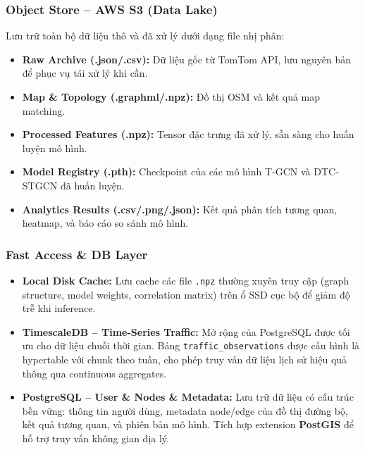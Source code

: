 \subsubsection{Object Store -- AWS S3 (Data Lake)}
Lưu trữ toàn bộ dữ liệu thô và đã xử lý dưới dạng file nhị phân:
\begin{itemize}
    \item \textbf{Raw Archive (.json/.csv):} Dữ liệu gốc từ TomTom API, lưu nguyên bản để phục vụ tái xử lý khi cần.
    \item \textbf{Map \& Topology (.graphml/.npz):} Đồ thị OSM và kết quả map matching.
    \item \textbf{Processed Features (.npz):} Tensor đặc trưng đã xử lý, sẵn sàng cho huấn luyện mô hình.
    \item \textbf{Model Registry (.pth):} Checkpoint của các mô hình T-GCN và DTC-STGCN đã huấn luyện.
    \item \textbf{Analytics Results (.csv/.png/.json):} Kết quả phân tích tương quan, heatmap, và báo cáo so sánh mô hình.
\end{itemize}

\subsubsection{Fast Access \& DB Layer}
\begin{itemize}
    \item \textbf{Local Disk Cache:} Lưu cache các file \texttt{.npz} thường xuyên truy cập (graph structure, model weights, correlation matrix) trên ổ SSD cục bộ để giảm độ trễ khi inference.
    \item \textbf{TimescaleDB -- Time-Series Traffic:} Mở rộng của PostgreSQL được tối ưu cho dữ liệu chuỗi thời gian. Bảng \texttt{traffic\_observations} được cấu hình là hypertable với chunk theo tuần, cho phép truy vấn dữ liệu lịch sử hiệu quả thông qua continuous aggregates.
    \item \textbf{PostgreSQL -- User \& Nodes \& Metadata:} Lưu trữ dữ liệu có cấu trúc bền vững: thông tin người dùng, metadata node/edge của đồ thị đường bộ, kết quả tương quan, và phiên bản mô hình. Tích hợp extension \textbf{PostGIS} để hỗ trợ truy vấn không gian địa lý.
\end{itemize}

